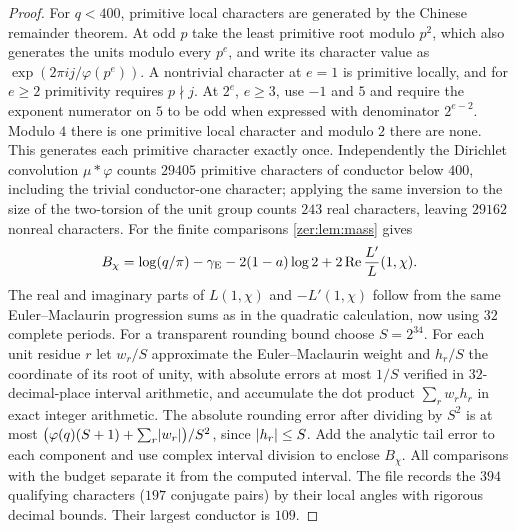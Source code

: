 \begin{proof}
For $q<400$, primitive local characters are generated by the Chinese remainder theorem. At
odd $p$ take the least primitive root modulo $p^2$, which also generates the units modulo
every $p^e$, and write its character value as $\exp(2\pi ij/\varphi(p^e))$. A nontrivial
character at $e=1$ is primitive locally, and for $e\ge2$ primitivity requires $p\nmid j$.
At $2^e$, $e\ge3$, use $-1$ and $5$ and require the exponent numerator on $5$ to be odd
when expressed with denominator $2^{e-2}$. Modulo $4$ there is one primitive local
character and modulo $2$ there are none. This generates each primitive character exactly
once. Independently the Dirichlet convolution $\mu*\varphi$ counts $29405$ primitive
characters of conductor below $400$, including the trivial conductor-one character;
applying the same inversion to the size of the two-torsion of the unit group counts $243$
real characters, leaving $29162$ nonreal characters. For the finite comparisons
\cref{zer:lem:mass} gives
\[
 B_\chi=\log(q/\pi)-\gamma_{\mathrm{E}}-2(1-a)\log2+2\operatorname{Re}\frac{L'}L(1,\chi).
\]
The real and imaginary parts of $L(1,\chi)$ and $-L'(1,\chi)$ follow from the same
Euler--Maclaurin progression sums as in the quadratic calculation, now using $32$ complete
periods. For a transparent rounding bound choose $S=2^{34}$. For each unit residue $r$ let
$w_r/S$ approximate the Euler--Maclaurin weight and $h_r/S$ the coordinate of its root of
unity, with absolute errors at most $1/S$ verified in $32$-decimal-place interval
arithmetic, and accumulate the dot product $\sum_rw_rh_r$ in exact integer arithmetic. The
absolute rounding error after dividing by $S^2$ is at most
$\bigl(\varphi(q)(S+1)+\sum_r\lvert w_r\rvert\bigr)/S^2$, since $\lvert h_r\rvert\le S$. Add the analytic
tail error to each component and use complex interval division to enclose $B_\chi$. All
comparisons with the budget separate it from the computed interval. The file
 records the $394$ qualifying characters ($197$
conjugate pairs) by their local angles with rigorous decimal bounds. Their largest
conductor is $109$.


\end{proof}
